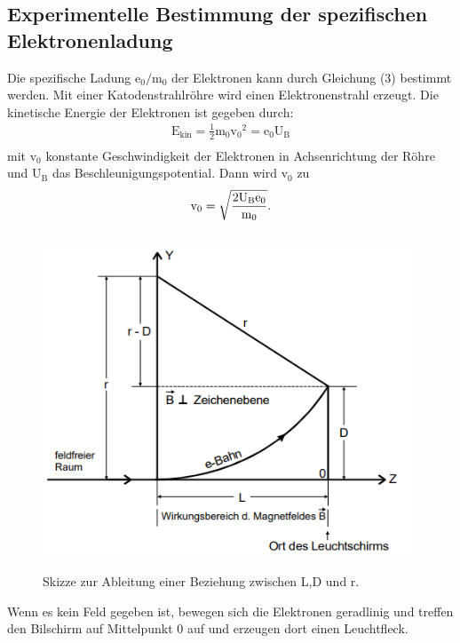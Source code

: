 \subsection{Experimentelle Bestimmung der spezifischen Elektronenladung}
 Die spezifische Ladung $\text{e}_0/{\text{m}_0}$ der Elektronen kann durch Gleichung (3) bestimmt werden.  Mit einer Katodenstrahlröhre wird einen Elektronenstrahl erzeugt. 
Die kinetische Energie der Elektronen ist gegeben durch:
\begin{align*} 
    \text{E}_{\text{kin}}= \frac{1}{2} \text{m}_0 {\text{v}_0}^2 =  \text{e}_0  \text{U}_\text{B} \\
\end{align*}
\noindent mit $\text{v}_0$ konstante Geschwindigkeit der Elektronen in Achsenrichtung der Röhre und $\text{U}_\text{B}$ das Beschleunigungspotential.
Dann wird $\text{v}_0$ zu
\begin{equation}
    \text{v}_0 = \sqrt{\frac{2 \text{U}_\text{B} \text{e}_0} {\text{m}_0} }.\\  
\end{equation}
\noindent
\begin{figure}[H]
    \begin{center}
    \includegraphics[width = 11cm, height= 10cm]{grafik.png}
    \caption{Skizze zur Ableitung einer Beziehung zwischen L,D und r.\protect\cite{AL}}
    \end{center}
    \label{fig:grafik}
    \end{figure}
    \noindent
Wenn es kein Feld gegeben ist, bewegen sich die Elektronen geradlinig und treffen den Bilschirm auf Mittelpunkt 0 auf und erzeugen dort einen Leuchtfleck.
